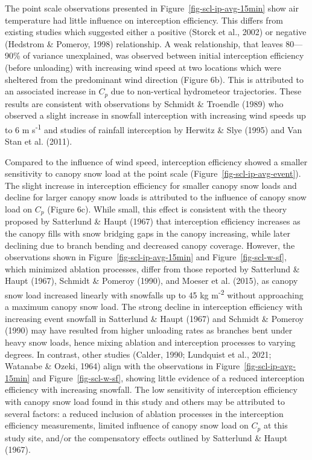 \documentclass[
  letterpaper,
  DIV=11,
  numbers=noendperiod]{scrartcl}
\begin{document}
The point scale observations presented in
Figure~\ref{fig-scl-ip-avg-15min} show air temperature had little
influence on interception efficiency. This differs from existing studies
which suggested either a positive (Storck et al., 2002) or negative
(Hedstrom \& Pomeroy, 1998) relationship. A weak relationship, that
leaves 80---90\% of variance unexplained, was observed between initial
interception efficiency (before unloading) with increasing wind speed at
two locations which were sheltered from the predominant wind direction
(Figure 6b). This is attributed to an associated increase in \(C_p\) due
to non-vertical hydrometeor trajectories. These results are consistent
with observations by Schmidt \& Troendle (1989) who observed a slight
increase in snowfall interception with increasing wind speeds up to 6 m
s\textsuperscript{-1} and studies of rainfall interception by Herwitz \&
Slye (1995) and Van Stan et al. (2011).

Compared to the influence of wind speed, interception efficiency showed
a smaller sensitivity to canopy snow load at the point scale
(Figure~\ref{fig-scl-ip-avg-event}). The slight increase in interception
efficiency for smaller canopy snow loads and decline for larger canopy
snow loads is attributed to the influence of canopy snow load on \(C_p\)
(Figure 6c). While small, this effect is consistent with the theory
proposed by Satterlund \& Haupt (1967) that interception efficiency
increases as the canopy fills with snow bridging gaps in the canopy
increasing, while later declining due to branch bending and decreased
canopy coverage. However, the observations shown in
Figure~\ref{fig-scl-ip-avg-15min} and Figure~\ref{fig-scl-w-sf}, which
minimized ablation processes, differ from those reported by Satterlund
\& Haupt (1967), Schmidt \& Pomeroy (1990), and Moeser et al. (2015), as
canopy snow load increased linearly with snowfalls up to 45 kg
m\textsuperscript{-2} without approaching a maximum canopy snow load.
The strong decline in interception efficiency with increasing event
snowfall in Satterlund \& Haupt (1967) and Schmidt \& Pomeroy (1990) may
have resulted from higher unloading rates as branches bent under heavy
snow loads, hence mixing ablation and interception processes to varying
degrees. In contrast, other studies (Calder, 1990; Lundquist et al.,
2021; Watanabe \& Ozeki, 1964) align with the observations in
Figure~\ref{fig-scl-ip-avg-15min} and Figure~\ref{fig-scl-w-sf}, showing
little evidence of a reduced interception efficiency with increasing
snowfall. The low sensitivity of interception efficiency with canopy
snow load found in this study and others may be attributed to several
factors: a reduced inclusion of ablation processes in the interception
efficiency measurements, limited influence of canopy snow load on
\(C_p\) at this study site, and/or the compensatory effects outlined by
Satterlund \& Haupt (1967).
\end{document}
